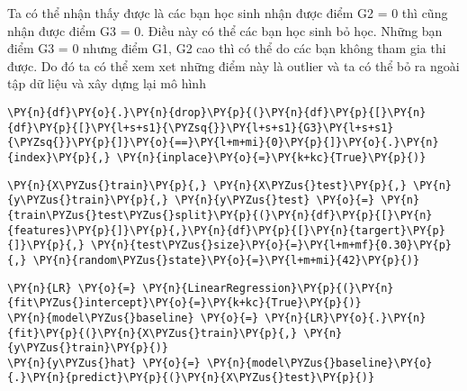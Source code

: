     Ta có thể nhận thấy được là các bạn học sinh nhận được điểm G2 = 0 thì
cũng nhận được điểm G3 = 0. Điều này có thể các bạn học sinh bỏ học.
Những bạn điểm G3 = 0 nhưng điểm G1, G2 cao thì có thể do các bạn không
tham gia thi được. Do đó ta có thể xem xet những điểm này là outlier và
ta có thể bỏ ra ngoài tập dữ liệu và xây dựng lại mô hình

    \begin{tcolorbox}[breakable, size=fbox, boxrule=1pt, pad at break*=1mm,colback=cellbackground, colframe=cellborder]
\begin{Verbatim}[commandchars=\\\{\}]
\PY{n}{df}\PY{o}{.}\PY{n}{drop}\PY{p}{(}\PY{n}{df}\PY{p}{[}\PY{n}{df}\PY{p}{[}\PY{l+s+s1}{\PYZsq{}}\PY{l+s+s1}{G3}\PY{l+s+s1}{\PYZsq{}}\PY{p}{]}\PY{o}{==}\PY{l+m+mi}{0}\PY{p}{]}\PY{o}{.}\PY{n}{index}\PY{p}{,} \PY{n}{inplace}\PY{o}{=}\PY{k+kc}{True}\PY{p}{)}
\end{Verbatim}
\end{tcolorbox}

    \begin{tcolorbox}[breakable, size=fbox, boxrule=1pt, pad at break*=1mm,colback=cellbackground, colframe=cellborder]
\begin{Verbatim}[commandchars=\\\{\}]
\PY{n}{X\PYZus{}train}\PY{p}{,} \PY{n}{X\PYZus{}test}\PY{p}{,} \PY{n}{y\PYZus{}train}\PY{p}{,} \PY{n}{y\PYZus{}test} \PY{o}{=} \PY{n}{train\PYZus{}test\PYZus{}split}\PY{p}{(}\PY{n}{df}\PY{p}{[}\PY{n}{features}\PY{p}{]}\PY{p}{,}\PY{n}{df}\PY{p}{[}\PY{n}{targert}\PY{p}{]}\PY{p}{,} \PY{n}{test\PYZus{}size}\PY{o}{=}\PY{l+m+mf}{0.30}\PY{p}{,} \PY{n}{random\PYZus{}state}\PY{o}{=}\PY{l+m+mi}{42}\PY{p}{)}
\end{Verbatim}
\end{tcolorbox}

    \begin{tcolorbox}[breakable, size=fbox, boxrule=1pt, pad at break*=1mm,colback=cellbackground, colframe=cellborder]
\begin{Verbatim}[commandchars=\\\{\}]
\PY{n}{LR} \PY{o}{=} \PY{n}{LinearRegression}\PY{p}{(}\PY{n}{fit\PYZus{}intercept}\PY{o}{=}\PY{k+kc}{True}\PY{p}{)}
\PY{n}{model\PYZus{}baseline} \PY{o}{=} \PY{n}{LR}\PY{o}{.}\PY{n}{fit}\PY{p}{(}\PY{n}{X\PYZus{}train}\PY{p}{,} \PY{n}{y\PYZus{}train}\PY{p}{)}
\PY{n}{y\PYZus{}hat} \PY{o}{=} \PY{n}{model\PYZus{}baseline}\PY{o}{.}\PY{n}{predict}\PY{p}{(}\PY{n}{X\PYZus{}test}\PY{p}{)}
\end{Verbatim}
\end{tcolorbox}

